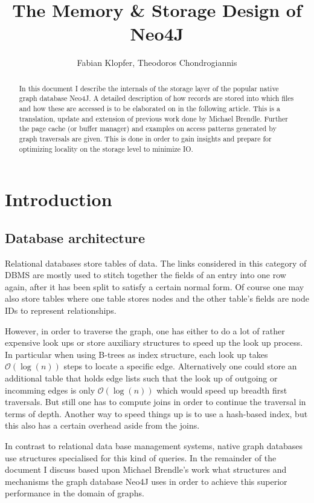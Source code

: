 \documentclass[a4paper,10pt]{article}
\title{The Memory \& Storage Design of Neo4J}
\author{Fabian Klopfer, Theodoros Chondrogiannis}
\begin{document}
\maketitle
\vspace{2cm}

\begin{abstract}
In this document I describe the internals of the storage layer of the popular native graph database Neo4J. A detailed description of how records are stored into which files and how these are accessed is to be elaborated on in the following article. This is a translation, update and extension of previous work done by Michael Brendle. Further the page cache (or buffer manager) and examples on access patterns generated by graph traversals are given. This is done in order to gain insights and prepare for optimizing locality on the storage level to minimize IO.
\end{abstract} \newpage

\tableofcontents \newpage

\section{Introduction}
\subsection{Database architecture}
Relational databases store tables of data. The links considered in this category of DBMS are mostly used to stitch together the fields of an entry into one row again, after it has been split to satisfy a certain normal form. Of course one may also store tables where one table stores nodes and the other table's fields are node IDs to represent relationships.

However, in order to traverse the graph, one has either to do a lot of rather expensive look ups or store auxiliary structures to speed up the look up process. In particular when using B-trees as index structure, each look up takes $\mathcal{O}(\log(n))$ steps to locate a specific edge. Alternatively one could store an additional table that holds edge lists such that the look up of outgoing or incomming edges is only $\mathcal{O}(\log(n))$ which would speed up breadth first traversals. But still one has to compute joins in order to continue the traversal in terms of depth. Another way to speed things up is to use a hash-based index, but this also has a certain overhead aside from the joins.

In contrast to relational data base management systems, native graph data\-bases use structures specialised for this kind of queries. In the remainder of the document I discuss based upon Michael Brendle's work what structures and mechanisms the graph database Neo4J uses in order to achieve this superior performance in the domain of graphs.
\end{document}
